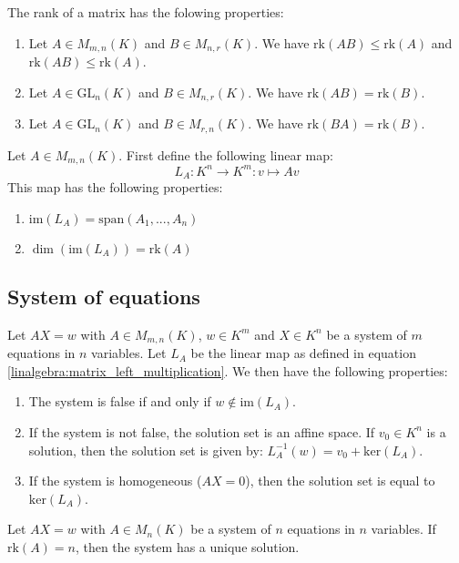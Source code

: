 	\begin{property}\label{linalgebra:rank_properties}
	        The rank of a matrix has the folowing properties:
        	\begin{enumerate}
			\item Let $A\in M_{m,n}(K)$ and $B\in M_{n,r}(K)$. We have $\text{rk}(AB)\leq\text{rk}(A)$ and $\text{rk}(AB)\leq\text{rk}(A)$.
        		\item Let $A\in\text{GL}_n(K)$ and $B\in M_{n,r}(K)$. We have $\text{rk}(AB)=\text{rk}(B)$.
		        \item Let $A\in\text{GL}_n(K)$ and $B\in M_{r,n}(K)$. We have $\text{rk}(BA)=\text{rk}(B)$.
		\end{enumerate}
	\end{property}
	\begin{property}\label{linalgebra:dim_matrix_left_multiplication}
	        Let $A\in M_{m,n}(K)$. First define the following linear map:
        	\begin{equation}
			\label{linalgebra:matrix_left_multiplication}
        		\boxed{L_A:K^n\rightarrow K^m:v\mapsto Av}
		\end{equation}
	        This map has the following properties:
        	\begin{enumerate}
        		\item $\text{im}(L_A) = \text{span}(A_1, ..., A_n)$
			\item $\dim(\text{im}(L_A))=\text{rk}(A)$
		\end{enumerate}
	\end{property}
    
\subsection{System of equations}

	\begin{theorem}\label{linalgebra:matrix_and_equations}
	        Let $AX=w$ with $A\in M_{m,n}(K)$, $w\in K^m$ and $X\in K^n$ be a system of $m$ equations in $n$ variables. Let $L_A$ be the linear map as defined in equation \ref{linalgebra:matrix_left_multiplication}. We then have the following properties:
        	\begin{enumerate}
			\item The system is false if and only if $w\not\in\text{im}(L_A)$.
        		\item If the system is not false, the solution set is an affine space. If $v_0\in K^n$ is a solution, then the solution set is given by: $L_A^{-1}(w)=v_0+\text{ker}(L_A)$.
		        \item If the system is homogeneous ($AX=0$), then the solution set is equal to $\text{ker}(L_A)$.
		\end{enumerate}
	\end{theorem}
	\begin{theorem}[Uniqueness]\label{linalgebra:rank_unique_solution}
	        Let $AX=w$ with $A\in M_n(K)$ be a system of $n$ equations in $n$ variables. If $\text{rk}(A)=n$, then the system has a unique solution.
	\end{theorem}
    
